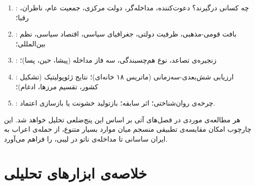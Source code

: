 \begin{tcolorbox}[mybox,
title={توضیح پنج ضلع}]
\begin{enumerate}[label=\textbf{\arabic*.}, nosep, rightmargin=1em]
\item {}: چه کسانی درگیرند؟ دعوت‌کننده، مداخله‌گر،
دولت مرکزی، جمعیت عام، ناظران، رقبا؛
\item {}: بافت قومی-مذهبی، ظرفیت دولتی، جغرافیای
سیاسی، اقتصاد سیاسی، نظم بین‌المللی؛
\item {}: زنجیره‌ی تصاعد، نوع هم‌چسبندگی،
سه فاز مداخله (پیشا، حین، پسا)؛
\item {}: ارزیابی شش‌بعدی-سه‌زمانی (ماتریس ۱۸
خانه‌ای)؛ نتایج ژئوپولیتیک (تشکیل کشور، تقسیم مرزها، ادغام)؛
\item {}: چرخه‌ی روان‌شناختی؛ اثر سابقه؛ بازتولید
خشونت یا بازسازی اعتماد.
\end{enumerate}

هر مطالعه‌ی موردی در فصل‌های آتی بر اساس این پنج‌ضلعی تحلیل
خواهد شد. این چارچوب امکان مقایسه‌ی تطبیقی منسجم میان موارد
بسیار متنوع، از حمله‌ی اعراب به ایران ساسانی تا مداخله‌ی
ناتو در لیبی، را فراهم می‌آورد.
\end{tcolorbox}


\section{خلاصه‌ی ابزارهای تحلیلی}
\label{sec:ch04-tools-summary}

